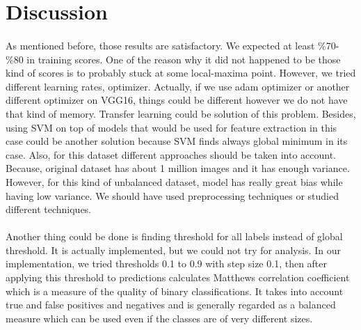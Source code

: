 \documentclass[12pt]{article}
\begin{document}
\section{Discussion}
\paragraph{}As mentioned before, those results are satisfactory. We expected at least \%70-\%80 in training scores. One of the reason why it did not happened to be those kind of scores is to probably stuck at some local-maxima point. However, we tried different learning rates, optimizer. Actually, if we use adam optimizer or another different optimizer on VGG16, things could be different however we do not have that kind of memory. Transfer learning could be solution of this problem. Besides, using SVM on top of models that would be used for feature extraction in this case could be another solution because SVM finds always global minimum in its case. Also, for this dataset different approaches should be taken into account. Because, original dataset has about 1 million images and it has enough variance. However, for this kind of unbalanced dataset, model has really great bias while having low variance. We should have used preprocessing techniques or studied different techniques.  
\paragraph{}Another thing could be done is finding threshold for all labels instead of global threshold. It is actually implemented, but we could not try for analysis. In our implementation, we tried thresholds 0.1 to 0.9 with step size 0.1, then after applying this threshold to predictions calculates Matthews correlation coefficient which is a measure of the quality of binary classifications.\cite{matcof} It takes into account true and false positives and negatives and is generally regarded as a balanced measure which can be used even if the classes are of very different sizes. 
\end{document}
